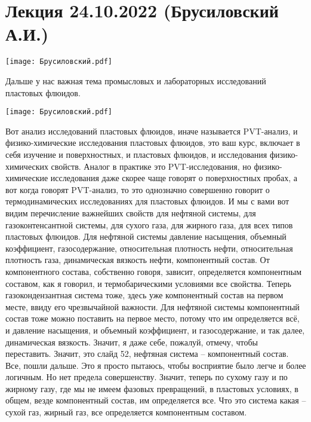 \documentclass[main.tex]{subfiles}
\begin{document}
\section{Лекция 24.10.2022 (Брусиловский А.И.)}

\begin{center}
\texttt{[image: Брусиловский.pdf]}
\end{center}

Дальше у нас важная тема промысловых и лабораторных исследований пластовых флюидов.

\begin{center}
\texttt{[image: Брусиловский.pdf]}
\end{center}

Вот анализ исследований пластовых флюидов, иначе называется PVT-анализ, и физико-химические исследования пластовых флюидов, это ваш курс, включает в себя изучение и поверхностных, и пластовых флюидов, и исследования физико-химических свойств.
Аналог в практике это PVT-исследования, но физико-химические исследования даже скорее чаще говорят о поверхностных пробах, а вот когда говорят PVT-анализ, то это однозначно совершенно говорит о термодинамических исследованиях для пластовых флюидов.
И мы с вами вот видим перечисление важнейших свойств для нефтяной системы, для газоконтенсантной системы, для сухого газа, для жирного газа, для всех типов пластовых флюидов.
Для нефтяной системы давление насыщения, объемный коэффициент, газосодержание, относительная плотность нефти, относительная плотность газа, динамическая вязкость нефти, компонентный состав.
От компонентного состава, собственно говоря, зависит, определяется компонентным составом, как я говорил, и термобарическими условиями все свойства.
Теперь газокондензантная система тоже, здесь уже компонентный состав на первом месте, ввиду его чрезвычайной важности.
Для нефтяной системы компонентный состав тоже можно поставить на первое место, потому что им определяется всё, и давление насыщения, и объемный коэффициент, и газосодержание, и так далее, динамическая вязкость.
Значит, я даже себе, пожалуй, отмечу, чтобы переставить.
Значит, это слайд 52, нефтяная система -- компонентный состав.
Все, пошли дальше.
Это я просто пытаюсь, чтобы восприятие было легче и более логичным.
Но нет предела совершенству.
Значит, теперь по сухому газу и по жирному газу, где мы не имеем фазовых превращений, в пластовых условиях, в общем, везде компонентный состав, им определяется все.
Что это система какая -- сухой газ, жирный газ, все определяется компонентным составом.
\end{document}
